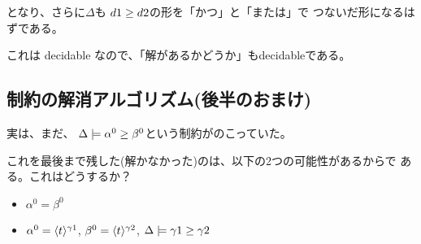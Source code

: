 \documentclass[dvipdfmx]{jsarticle}
\newcommand\longer[2]{{#1} \ord {#2}}
\begin{document}
となり、さらに$\Delta$も $\longer{d1}{d2}$の形を「かつ」と「または」で
つないだ形になるはずである。

これは decidable なので、「解があるかどうか」もdecidableである。

\subsection{制約の解消アルゴリズム(後半のおまけ)}

実は、まだ、
$\Delta \models \longer{\alpha^0}{\beta^0}$という制約がのこっていた。

これを最後まで残した(解かなかった)のは、以下の2つの可能性があるからで
ある。これはどうするか？

\begin{itemize}
\item $\alpha^0 = \beta^0$
\item
  $\alpha^0 = \langle{t}\rangle^{\gamma1}$,
  $\beta^0 = \langle{t}\rangle^{\gamma2}$,
  $\Delta \models \longer{\gamma1}{\gamma2}$
\end{itemize}
\end{document}
